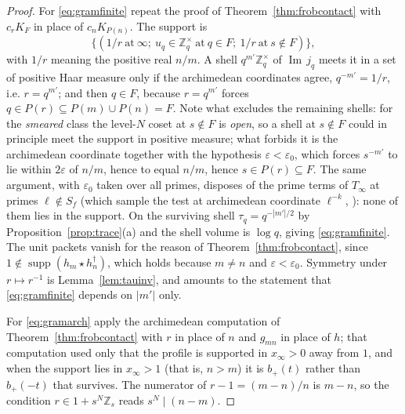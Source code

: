 \documentclass[11pt]{amsart}
\theoremstyle{definition}
\theoremstyle{remark}
\newcommand{\Z}{\mathbb Z}
\newcommand{\Iml}{\operatorname{Im}}
\newcommand{\supp}{\operatorname{supp}}
\begin{document}
\begin{proof}
For \eqref{eq:gramfinite} repeat the proof of Theorem~\ref{thm:frobcontact}
with $c_rK_F$ in place of $c_nK_{P(n)}$. The support is
\[
  \bigl\{(1/r\ \text{at}\ \infty;\ u_q\in\Z_q^\times\ \text{at}\ q\in F;\
   1/r\ \text{at}\ s\notin F)\bigr\},
\]
with $1/r$ meaning the positive real $n/m$. A shell $q^{m'}\Z_q^\times$ of
$\Iml\,j_q$ meets it in a set of positive Haar measure only if the archimedean
coordinates agree, $q^{-m'}=1/r$, i.e. $r=q^{m'}$; and then $q\in F$, because
$r=q^{m'}$ forces $q\in P(r)\subseteq P(m)\cup P(n)=F$.  Note what excludes the
remaining shells: for the \emph{smeared} class
the level-$N$ coset at $s\notin F$ is \emph{open}, so a shell at $s\notin F$
could in principle meet the support in positive measure; what forbids it is the
archimedean coordinate together with the hypothesis
$\varepsilon<\varepsilon_0$, which forces $s^{-m'}$ to lie within $2\varepsilon$
of $n/m$, hence to equal $n/m$, hence $s\in P(r)\subseteq F$. The same
argument, with $\varepsilon_0$ taken over all primes, disposes of the prime
terms of $T_\infty$ at primes $\ell\notin S_f$ (which sample the test at
archimedean coordinate $\ell^{-k}$, \cite[Thm.~11.6(b)]{Companion}): none of them
lies in the support. On the surviving
shell $\tau_q=q^{-|m'|/2}$ by Proposition~\ref{prop:trace}(a) and the shell
volume is $\log q$, giving \eqref{eq:gramfinite}. The unit packets vanish for
the reason of Theorem~\ref{thm:frobcontact}, since $1\notin
\supp(h_m\star h_n^\dagger)$, which holds because $m\ne n$ and
$\varepsilon<\varepsilon_0$. Symmetry under $r\mapsto r^{-1}$ is
Lemma~\ref{lem:tauinv}, and amounts to the statement that
\eqref{eq:gramfinite} depends on $|m'|$ only.

For \eqref{eq:gramarch} apply the archimedean computation of
Theorem~\ref{thm:frobcontact} with $r$ in place of $n$ and $g_{mn}$ in place
of $h$; that computation used only that the profile is supported in
$x_\infty>0$ away from $1$, and when the support lies in $x_\infty>1$ (that is,
$n>m$) it is $b_+(t)$ rather than $b_+(-t)$ that survives. The numerator of
$r-1=(m-n)/n$ is $m-n$, so the condition $r\in1+s^N\Z_s$ reads
$s^N\mid(n-m)$.
\end{proof}
\end{document}
